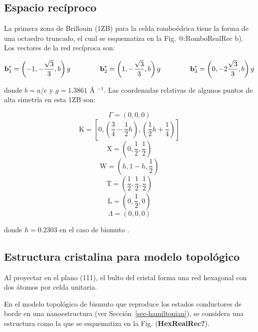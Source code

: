 \documentclass[
  letterpaper,
  DIV=11,
  numbers=noendperiod]{scrreprt}
\begin{document}
\hypertarget{espacio-recuxedproco}{%
\subsection{Espacio recíproco}\label{espacio-recuxedproco}}

La primera zona de Brillouin (1ZB) para la celda romboédrica tiene la
forma de una octaedro truncado, el cual se esquematiza en la Fig.
@:RomboRealRec b). Los vectores de la red recíproca son:

\[
    \mathbf{b}_1^r = \left ( -1 , - \frac{\sqrt{3}}{3} , b \right )g  \hspace{15mm}
    \mathbf{b}_2^r = \left (  1 , - \frac{\sqrt{3}}{3} , b \right )g  \hspace{15mm} 
    \mathbf{b}_3^r = \left (  0 , -2\frac{\sqrt{3}}{3} , b \right )g  
\]

donde \(b= a/c\) y \(g=1.3861\) Å \(^{-1}\). Las coordenadas relativas
de algunos puntos de alta simetría en esta 1ZB son:

\[
    \Gamma = \left ( 0,0,0 \right )
\] \[
    \mathrm{K} = \left [ 0,\left (\frac{3}{4}-\frac{1}{2} h \right ), \left ( \frac{1}{2} h +\frac{1}{4} \right ) \right ] 
\] \[
    \mathrm{X} = \left ( 0,\frac{1}{2},\frac{1}{2} \right )
\] \[
    \mathrm{W} = \left ( h,1-h,\frac{1}{2} \right )
\] \[
    \mathrm{T} = \left ( \frac{1}{2},\frac{1}{2},\frac{1}{2} \right )
\] \[
    \mathrm{L} = \left ( 0,\frac{1}{2},0 \right )
\] \[
    \Lambda = \left ( 0,0,0 \right )
\]

donde \(h=0.2303\) en el caso de bismuto \cite{Falicov1965}.

\hypertarget{estructura-cristalina-para-modelo-topoluxf3gico}{%
\subsection{Estructura cristalina para modelo
topológico}\label{estructura-cristalina-para-modelo-topoluxf3gico}}

Al proyectar en el plano (111), el bulto del cristal forma una red
hexagonal con dos átomos por celda unitaria.

En el modelo topológico de bismuto \cite{Schindler2018} que reproduce
los estados conductores de borde en una nanoestructura (ver
Sección~\ref{sec-hamiltonian}), se considera una estructura como la que
se esquematiza en la Fig. (\textbf{HexRealRec?}).
\end{document}

